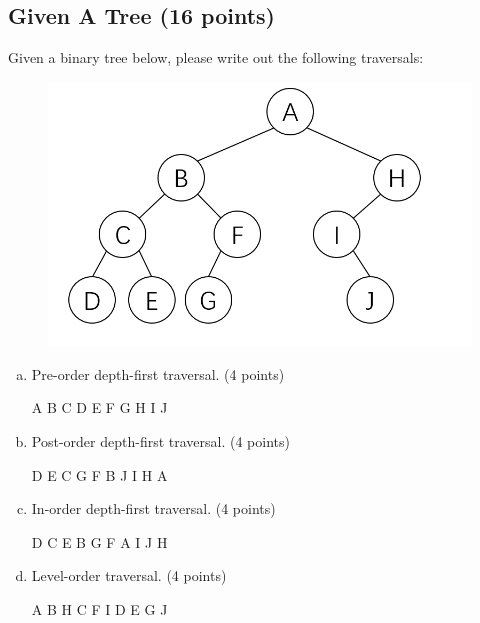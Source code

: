 \documentclass[11pt]{exam}
\begin{document}
\subsection{Given A Tree (16 points)}
Given a binary tree below, please write out the following traversals:
\begin{figure}[H]
\centering
\includegraphics[width=.5\linewidth]{binary_tree.png}
\end{figure}
\begin{enumerate}[(a)]
\item Pre-order depth-first traversal. (4 points)
\begin{solution}
A B C D E F G H I J
\end{solution}

\item Post-order depth-first traversal. (4 points)
\begin{solution}
D E C G F B J I H A
\end{solution}

\item In-order depth-first traversal. (4 points)
\begin{solution}
D C E B G F A I J H
\end{solution}

\item Level-order traversal. (4 points)
\begin{solution}
A B H C F I D E G J
\end{solution}

\end{enumerate}
\end{document}
